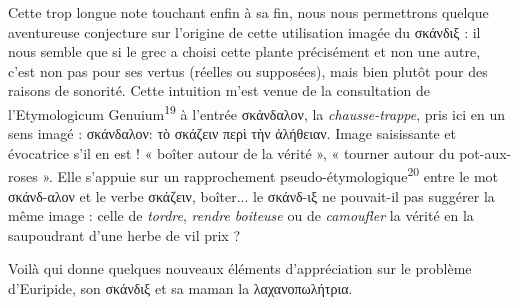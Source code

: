 \documentclass[12pt]{book}%
\newcommand{\italique}[1]{\textit{#1}}%
\newcommand{\latin}[1]{{\policeLat #1}}%
\newcommand{\marqueur}[1]{\textsuperscript{#1}}%
\newenvironment{groupe}{%
\pstart%
\ledgroup%
}{%
\pend %
}%
\begin{document}
\begin{pages}
\begin{Leftside}
\begin{groupe}
{{Cette trop longue note touchant enfin à sa fin, nous nous permettrons quelque aventureuse conjecture sur l'origine de cette utilisation imagée du σκάνδιξ : il nous semble que si le grec a choisi cette plante précisément et non une autre, c'est non pas pour ses vertus (réelles ou supposées), mais bien plutôt pour des raisons de sonorité. Cette intuition m'est venue de la consultation de l'\latin{Etymologicum Genuium}\marqueur{19} à l'entrée σκάνδαλον, la \italique{chausse-trappe}, pris ici en un sens imagé : σκάνδαλον: τὸ σκάζειν περὶ τὴν ἀλήθειαν. 
Image saisissante et évocatrice s'il en est ! « boîter autour de la vérité », « tourner autour du pot-aux-roses ». 
Elle s'appuie sur un rapprochement pseudo-étymologique\marqueur{20} entre le mot σκάνδ-αλον et le verbe σκάζειν, boîter... le σκάνδ-ιξ ne pouvait-il pas suggérer la même image : celle de \italique{tordre}, \italique{rendre boiteuse} ou de \italique{camoufler} la vérité en la saupoudrant d'une herbe de vil prix ?


Voilà qui donne quelques nouveaux éléments d'appréciation sur le problème d'Euripide, son σκάνδιξ et sa maman la λαχανοπωλήτρια.

}}
\end{groupe}
\end{Leftside}
\end{pages}
\end{document}
